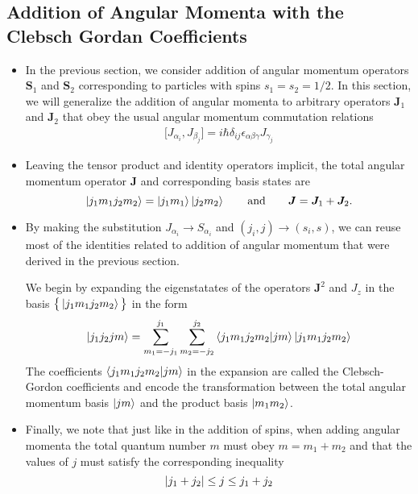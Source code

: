 \documentclass[11pt, a4paper]{article}
\renewcommand{\vec}[1]{\bm{#1}}  %
\renewcommand{\S}{\vec{S}}  %
\newcommand{\J}{\vec{J}}  %
\begin{document}
\subsection{Addition of Angular Momenta with the Clebsch Gordan Coefficients}
\begin{itemize}
    \item In the previous section, we consider addition of angular momentum operators $ \S_{1} $ and $ \S_{2} $ corresponding to particles with spins $ s_{1} = s_{2} = 1/2 $. In this section, we will generalize the addition of angular momenta to arbitrary operators $ \J_{1} $ and $ \J_{2} $ that obey the usual angular momentum commutation relations
    \begin{align*}
        \big[ J_{\alpha_{i}}, J_{\beta_{j}} \big] = i \hbar \delta_{ij}\epsilon_{\alpha\beta\gamma}J_{\gamma_{j}} 
    \end{align*}
    
    \item Leaving the tensor product and identity operators implicit, the total angular momentum operator $ \J $ and corresponding basis states are
    \begin{equation*}
        \ket{j_{1}m_{1}j_{2}m_{2}} = \ket{j_{1}m_{1}}\ket{j_{2}m_{2}} \qquad \text{and} \qquad \J = \J_{1} + \J_{2}.
    \end{equation*}
    
    \item By making the substitution $ J_{\alpha_{i}} \to S_{\alpha_{i}} $ and $ (j_{i}, j) \to (s_{i}, s) $, we can reuse most of the identities related to addition of angular momentum that were derived in the previous section.

    We begin by expanding the eigenstatates of the operators $ \J^{2} $ and $ J_{z} $ in the basis $ \big\{ \ket{j_{1}m_{1}j_{2}m_{2}} \big\} $ in the form
    \begin{equation*}
        \ket{j_{1}j_{2}jm} = \sum_{m_{1} = - j_{1}}^{j_{1}}\sum_{m_{2} = - j_{2}}^{j_{2}} \braket{j_{1}m_{1}j_{2}m_{2}}{jm} \ket{j_{1}m_{1}j_{2}m_{2}}
    \end{equation*}
    The coefficients $ \braket{j_{1}m_{1}j_{2}m_{2}}{jm} $ in the expansion are called the Clebsch-Gordon coefficients and encode the transformation between the total angular momentum basis $ \ket{jm} $ and the product basis $ \ket{m_{1}m_{2}} $. 

    \item Finally, we note that just like in the addition of spins, when adding angular momenta the total quantum number $ m $ must obey $ m = m_{1} + m_{2} $ and that the values of $ j $ must satisfy the corresponding inequality
    \begin{equation*}
        \abs{j_{1} + j_{2}} \leq j \leq j_{1} + j_{2}
    \end{equation*}

\end{itemize}
\end{document}
